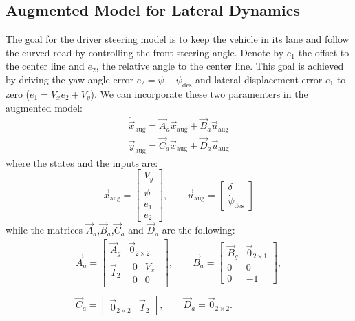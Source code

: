 \subsection{Augmented Model for Lateral Dynamics}
The goal for the driver steering model is to keep the vehicle in its lane and follow the curved road by controlling the front steering angle. Denote by $e_1$ the offset to the center line and $e_2$, the relative angle to the center line. This goal is achieved by driving the yaw angle error $e_2 = \psi -\psi_{\text{des}}$ and lateral displacement error $e_1$ to zero ($\dot{e}_1 = V_xe_2+V_y$). We can incorporate these two paramenters in the augmented model:
\begin{equation}
\label{eqn:lateral_dynamics_augmented_model}
\begin{array}{ll}
\dot{\vec{x}}_{\text{aug}} =\vec{A}_a \vec{x}_{\text{aug}}+ \vec{B}_a \vec{u}_{\text{aug}}\\
\vec{y}_{\text{aug}} = \vec{C}_a \vec{x}_{\text{aug}} + \vec{D}_a \vec{u}_{\text{aug}}
\end{array}
\end{equation}
where the states and the inputs are:
\begin{equation}
\vec{x}_{\text{aug}} = \begin{bmatrix}
V_y\\\dot{\psi}\\e_1\\e_2
\end{bmatrix},
\qquad
\vec{u}_{\text{aug}} = 
\begin{bmatrix}
\delta\\\dot{\psi}_{\text{des}}
\end{bmatrix}
\end{equation}
while the matrices $\vec{A}_a$,$\vec{B}_a$,$\vec{C}_a$ and $\vec{D}_a$ are the following:
\begin{equation}
\begin{array}{cc} 
\vec{A}_a=\begin{bmatrix}
\vec{A}_g&\vec{0}_{2\times2}\\
\vec{I}_2&\begin{matrix}
0&V_x\\
0&0
\end{matrix}
\end{bmatrix},
\qquad
\vec{B}_a=\begin{bmatrix}
\vec{B}_g&\vec{0}_{2\times1}\\
0&0\\
0&-1
\end{bmatrix},
\\\\
\vec{C}_a=\begin{bmatrix}
\vec{0}_{2\times2}&\vec{I}_2
\end{bmatrix}, 
\qquad
\vec{D}_a=
\vec{0}_{2\times2}. 
\end{array}
\end{equation}


